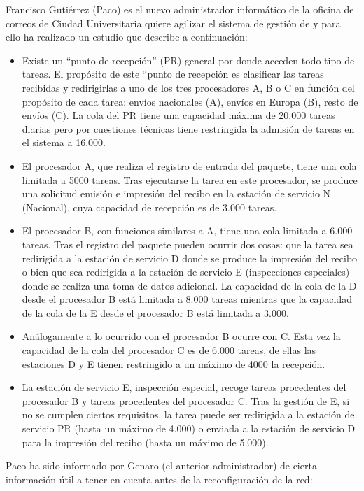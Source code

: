 Francisco  Gutiérrez  (Paco)  es  el  nuevo  administrador  informático  de  la  oficina  de  correos  de  Ciudad Universitaria quiere  agilizar el sistema de  gestión de  y para ello ha realizado un estudio que  describe  a continuación:

\begin{itemize}
    \item Existe  un \enquote{punto  de  recepción}  (PR)  general por  donde  acceden todo  tipo  de  tareas.  El  propósito  de este “punto de recepción es clasificar las tareas recibidas y redirigirlas a uno de los tres procesadores A, B o C en función del propósito de cada tarea: envíos nacionales (A), envíos en Europa (B), resto de envíos (C). La  cola  del  PR tiene  una  capacidad  máxima  de  20.000  tareas diarias pero por  cuestiones  técnicas tiene restringida la admisión de tareas en el sistema a 16.000.
    \item El procesador A, que realiza el registro de entrada del paquete, tiene una cola limitada a 5000 tareas. Tras ejecutarse la tarea en este procesador, se produce una solicitud emisión e impresión del recibo en la estación de servicio N (Nacional), cuya capacidad de recepción es de 3.000 tareas.
    \item El procesador B, con funciones similares a A, tiene una cola limitada a 6.000 tareas. Tras el registro del paquete pueden  ocurrir  dos  cosas:  que  la tarea  sea  redirigida  a  la  estación  de  servicio D  donde  se produce  la  impresión  del  recibo o  bien  que  sea  redirigida  a  la  estación  de  servicio E  (inspecciones especiales) donde  se realiza  una  toma  de  datos  adicional.  La capacidad  de  la  cola  de  la D desde  el procesador  B  está  limitada  a  8.000  tareas  mientras  que  la  capacidad de  la  cola  de  la E desde  el procesador B está limitada a 3.000.
    \item Análogamente  a  lo  ocurrido  con  el  procesador  B  ocurre  con  C.  Esta  vez  la  capacidad  de  la  cola  del procesador C es de 6.000 tareas, de ellas las estaciones D y E tienen restringido a un máximo de 4000 la recepción.
    \item La  estación  de  servicio E, inspección  especial,  recoge  tareas  procedentes  del  procesador  B  y  tareas procedentes  del  procesador  C. Tras  la  gestión  de  E, si  no  se  cumplen  ciertos  requisitos,  la tarea  puede ser redirigida a la estación de servicio PR (hasta un máximo de 4.000) o enviada a la estación de servicio D para la impresión del recibo (hasta un máximo de 5.000).
\end{itemize}
Paco ha  sido  informado por  Genaro  (el  anterior  administrador) de cierta  información  útil a tener  en cuenta antes de la reconfiguración de la red:

